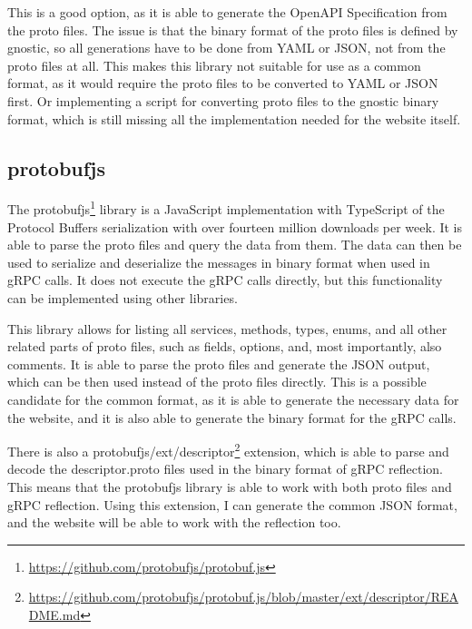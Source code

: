 This is a good option, as it is able to generate the OpenAPI Specification from the proto files.
The issue is that the binary format of the proto files is defined by gnostic, so all generations have to be done from YAML or JSON, not from the proto files at all.
This makes this library not suitable for use as a common format, as it would require the proto files to be converted to YAML or JSON first.
Or implementing a script for converting proto files to the gnostic binary format, which is still missing all the implementation needed for the website itself.


\subsection{protobufjs}
The protobufjs\footnote{\url{https://github.com/protobufjs/protobuf.js}} library is a JavaScript implementation with TypeScript of the Protocol Buffers serialization with over fourteen million downloads per week.
It is able to parse the proto files and query the data from them.
The data can then be used to serialize and deserialize the messages in binary format when used in gRPC calls.
It does not execute the gRPC calls directly, but this functionality can be implemented using other libraries.
\cite{protobufjs}

This library allows for listing all services, methods, types, enums, and all other related parts of proto files, such as fields, options, and, most importantly, also comments.
It is able to parse the proto files and generate the JSON output, which can be then used instead of the proto files directly.
This is a possible candidate for the common format, as it is able to generate the necessary data for the website, and it is also able to generate the binary format for the gRPC calls.

There is also a protobufjs/ext/descriptor\footnote{\url{https://github.com/protobufjs/protobuf.js/blob/master/ext/descriptor/README.md}} extension, which is able to parse and decode the descriptor.proto files used in the binary format of gRPC reflection.
This means that the protobufjs library is able to work with both proto files and gRPC reflection.
Using this extension, I can generate the common JSON format, and the website will be able to work with the reflection too.

